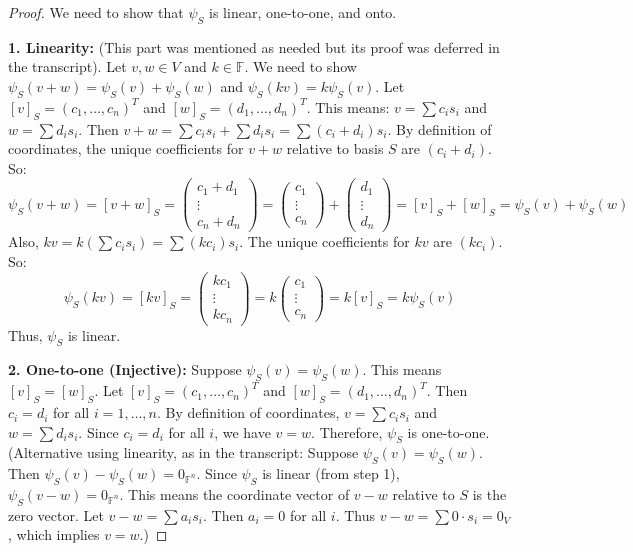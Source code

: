 \documentclass[11pt, letterpaper]{article}
\theoremstyle{mytheoremstyle}
\theoremstyle{mydefinitionstyle}
\theoremstyle{myremarkstyle}
\newcommand{\F}{\mathbb{F}}
\newcommand{\coord}[2]{[#1]_{#2}} %
\begin{document}
\begin{proof}
We need to show that $\psi_S$ is linear, one-to-one, and onto.

\textbf{1. Linearity:} (This part was mentioned as needed but its proof was deferred in the transcript).
Let $v, w \in V$ and $k \in \F$. We need to show $\psi_S(v+w) = \psi_S(v) + \psi_S(w)$ and $\psi_S(kv) = k \psi_S(v)$.
Let $\coord{v}{S} = (c_1, \dots, c_n)^T$ and $\coord{w}{S} = (d_1, \dots, d_n)^T$. This means:
$v = \sum c_i s_i$ and $w = \sum d_i s_i$.
Then $v+w = \sum c_i s_i + \sum d_i s_i = \sum (c_i + d_i) s_i$.
By definition of coordinates, the unique coefficients for $v+w$ relative to basis $S$ are $(c_i+d_i)$. So:
\[ \psi_S(v+w) = \coord{v+w}{S} = \begin{pmatrix} c_1+d_1 \\ \vdots \\ c_n+d_n \end{pmatrix} = \begin{pmatrix} c_1 \\ \vdots \\ c_n \end{pmatrix} + \begin{pmatrix} d_1 \\ \vdots \\ d_n \end{pmatrix} = \coord{v}{S} + \coord{w}{S} = \psi_S(v) + \psi_S(w) \]
Also, $kv = k(\sum c_i s_i) = \sum (kc_i) s_i$. The unique coefficients for $kv$ are $(kc_i)$. So:
\[ \psi_S(kv) = \coord{kv}{S} = \begin{pmatrix} kc_1 \\ \vdots \\ kc_n \end{pmatrix} = k \begin{pmatrix} c_1 \\ \vdots \\ c_n \end{pmatrix} = k \coord{v}{S} = k \psi_S(v) \]
Thus, $\psi_S$ is linear.

\textbf{2. One-to-one (Injective):}
Suppose $\psi_S(v) = \psi_S(w)$. This means $\coord{v}{S} = \coord{w}{S}$. Let $\coord{v}{S} = (c_1, \dots, c_n)^T$ and $\coord{w}{S} = (d_1, \dots, d_n)^T$. Then $c_i = d_i$ for all $i=1, \dots, n$.
By definition of coordinates, $v = \sum c_i s_i$ and $w = \sum d_i s_i$. Since $c_i = d_i$ for all $i$, we have $v = w$.
Therefore, $\psi_S$ is one-to-one.
(Alternative using linearity, as in the transcript: Suppose $\psi_S(v) = \psi_S(w)$. Then $\psi_S(v) - \psi_S(w) = 0_{\F^n}$. Since $\psi_S$ is linear (from step 1), $\psi_S(v-w) = 0_{\F^n}$. This means the coordinate vector of $v-w$ relative to $S$ is the zero vector. Let $v-w = \sum a_i s_i$. Then $a_i=0$ for all $i$. Thus $v-w = \sum 0 \cdot s_i = 0_V$, which implies $v=w$.)


\end{proof}
\end{document}
